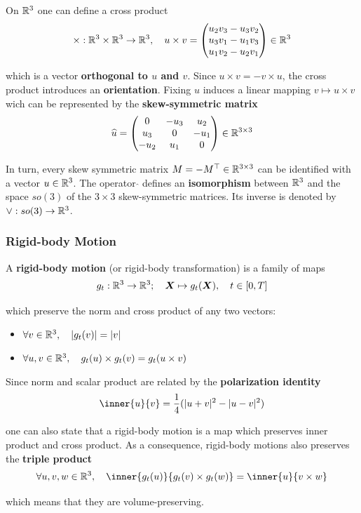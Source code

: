 On $\R^3$ one can define a cross product
\[\times : \R^3 \times \R^3 \rightarrow \R^3,\quad u \times v =
	\begin{pmatrix}
		u_2v_3 - u_3v_2 \\
		u_3v_1 - u_1v_3 \\
		u_1v_2 - u_2v_1
	\end{pmatrix} \in \R^3\]

which is a vector \textbf{orthogonal to $u$ and $v$}.
Since $u \times v = -v \times u$, the cross product introduces an \textbf{orientation}.
Fixing $u$ induces a linear mapping $v \mapsto u \times v$ wich
can be represented by the \textbf{skew-symmetric matrix}
\[\widehat{u} = \hatmat{u_1}{u_2}{u_3} \in \RR{3}{3}\]

In turn, every skew symmetric matrix $M = -\tr{M} \in \RR{3}{3}$
can be identified with a vector $u \in \R^3$.
The operator $\widehat{}$ defines an \textbf{isomorphism} between $\R^3$
and the space $so(3)$ of the $3 \times 3$ skew-symmetric matrices.
Its inverse is denoted by $\vee : so(3) \rightarrow \R^3$.


\subsubsection{Rigid-body Motion}%
\label{ssub:rigid_body_motion}

A \textbf{rigid-body motion} (or rigid-body transformation)
is a family of maps
\[g_t : \R^3 \rightarrow \R^3;\quad \bm{X} \mapsto g_t(\bm{X}),\quad t \in [0,T]\]

which preserve the norm and cross product of any two vectors:
\begin{itemize}
	\setlength\itemsep{-0.2em}
	\item $\forall v \in \R^3, \quad |g_t(v)| = |v|$
	\item $\forall u,v \in \R^3, \quad g_t(u) \times g_t(v) = g_t(u \times v)$
\end{itemize}

Since norm and scalar product are related by the \textbf{polarization identity}
\[\inner{u}{v} = \frac{1}{4}(|u+v|^2 - |u-v|^2)\]

one can also state that a rigid-body motion is a map which
preserves inner product and cross product.
As a consequence, rigid-body motions also preserves the \textbf{triple product}
\[\forall u, v, w \in \R^3, \quad
	\inner{g_t(u)}{g_t(v) \times g_t(w)} = \inner{u}{v \times w}\]

which means that they are volume-preserving.


